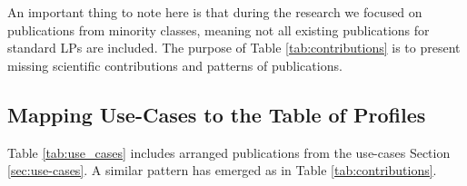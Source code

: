 An important thing to note here is that during the research we focused on publications from minority classes,
meaning not all existing publications for standard LPs are included. 
The purpose of Table \ref{tab:contributions} is to present missing scientific contributions and patterns of publications.  

\newcommand{\tabVar}{\textbf{+ daily} \\ \textbf{dim}  }

\subsection{Mapping Use-Cases to the Table of Profiles}

Table \ref{tab:use_cases} includes arranged publications from the use-cases Section \ref{sec:use-cases}. 
A similar pattern has emerged as in Table \ref{tab:contributions}. 

